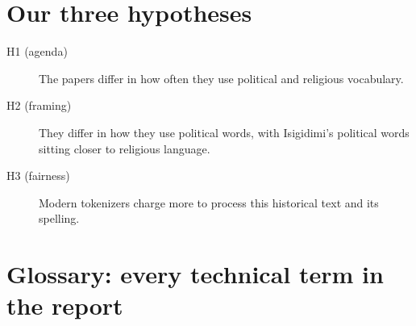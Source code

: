 \documentclass[11pt]{article}
\begin{document}
\section{Our three hypotheses}
\begin{description}
\item[H1 (agenda)] The papers differ in how often they use political and religious vocabulary.
\item[H2 (framing)] They differ in how they use political words, with Isigidimi's political words sitting closer to religious language.
\item[H3 (fairness)] Modern tokenizers charge more to process this historical text and its spelling.
\end{description}

\section{Glossary: every technical term in the report}
\end{document}
